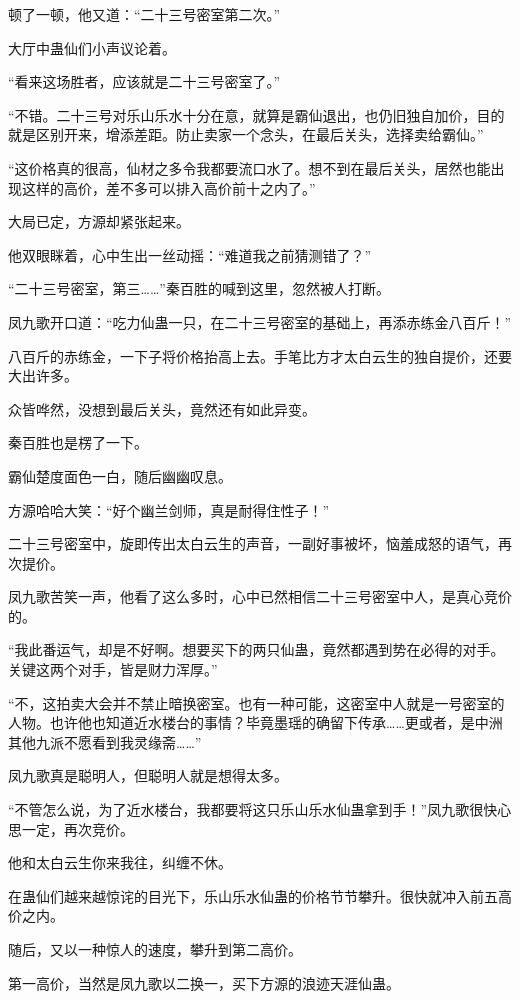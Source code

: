 \begin{this_body}
顿了一顿，他又道：“二十三号密室第二次。”

大厅中蛊仙们小声议论着。

“看来这场胜者，应该就是二十三号密室了。”

“不错。二十三号对乐山乐水十分在意，就算是霸仙退出，也仍旧独自加价，目的就是区别开来，增添差距。防止卖家一个念头，在最后关头，选择卖给霸仙。”

“这价格真的很高，仙材之多令我都要流口水了。想不到在最后关头，居然也能出现这样的高价，差不多可以排入高价前十之内了。”

大局已定，方源却紧张起来。

他双眼眯着，心中生出一丝动摇：“难道我之前猜测错了？”

“二十三号密室，第三……”秦百胜的喊到这里，忽然被人打断。

凤九歌开口道：“吃力仙蛊一只，在二十三号密室的基础上，再添赤练金八百斤！”

八百斤的赤练金，一下子将价格抬高上去。手笔比方才太白云生的独自提价，还要大出许多。

众皆哗然，没想到最后关头，竟然还有如此异变。

秦百胜也是楞了一下。

霸仙楚度面色一白，随后幽幽叹息。

方源哈哈大笑：“好个幽兰剑师，真是耐得住性子！”

二十三号密室中，旋即传出太白云生的声音，一副好事被坏，恼羞成怒的语气，再次提价。

凤九歌苦笑一声，他看了这么多时，心中已然相信二十三号密室中人，是真心竞价的。

“我此番运气，却是不好啊。想要买下的两只仙蛊，竟然都遇到势在必得的对手。关键这两个对手，皆是财力浑厚。”

“不，这拍卖大会并不禁止暗换密室。也有一种可能，这密室中人就是一号密室的人物。也许他也知道近水楼台的事情？毕竟墨瑶的确留下传承……更或者，是中洲其他九派不愿看到我灵缘斋……”

凤九歌真是聪明人，但聪明人就是想得太多。

“不管怎么说，为了近水楼台，我都要将这只乐山乐水仙蛊拿到手！”凤九歌很快心思一定，再次竞价。

他和太白云生你来我往，纠缠不休。

在蛊仙们越来越惊诧的目光下，乐山乐水仙蛊的价格节节攀升。很快就冲入前五高价之内。

随后，又以一种惊人的速度，攀升到第二高价。

第一高价，当然是凤九歌以二换一，买下方源的浪迹天涯仙蛊。


\end{this_body}
